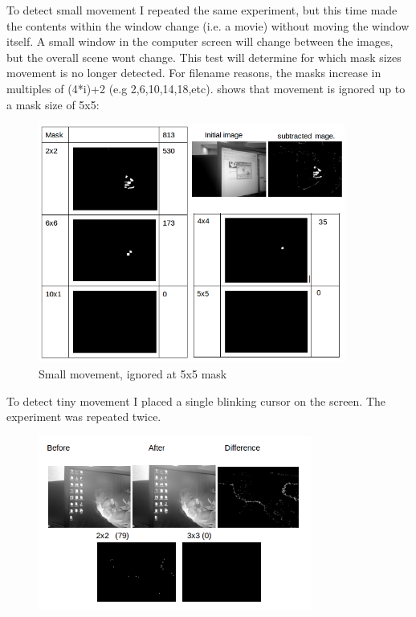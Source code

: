 \documentclass[11pt]{article} %
\begin{document}
{{To detect small movement I repeated the same experiment, but this time made the contents within the window change (i.e. a movie) without moving the window itself.  A small window in the computer screen will change between the images, but the overall scene wont change. This test will determine for which mask sizes movement is no longer detected.
For filename reasons, the masks increase in multiples of (4*i)+2  (e.g 2,6,10,14,18,etc).  shows that movement is ignored up to a mask size of 5x5:
\begin{figure}[H]
	\vspace{30pt}
	\begin{center}
		\includegraphics[width=0.9\textwidth]{../images/ImageOps/SMALL}
	\end{center}
	\vspace{10pt}
	\caption{Small  movement, ignored at 5x5 mask}	
	\label{img:small}
	\vspace{20pt}
\end{figure}
\pagebreak
To  detect tiny movement I placed a single blinking cursor on the screen. The experiment was repeated twice.
\begin{figure}[H]
	\vspace{-10pt}
	\begin{center}
		\includegraphics[width=0.8\textwidth]{../images/ImageOps/CURSOR1}

\end{center}
\end{figure}}}
\end{document}
